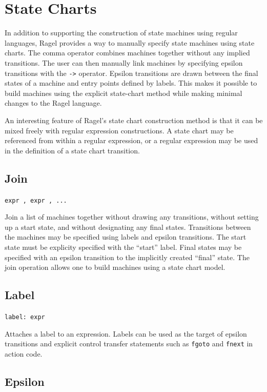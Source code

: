 \documentclass[letterpaper,11pt,oneside]{book}
\newcommand{\verbspace}{\vspace{10pt}}
\begin{document}
\section{State Charts}
\label{state-charts}

In addition to supporting the construction of state machines using regular
languages, Ragel provides a way to manually specify state machines using
state charts.  The comma operator combines machines together without any
implied transitions. The user can then manually link machines by specifying
epsilon transitions with the \verb|->| operator.  Epsilon transitions are drawn
between the final states of a machine and entry points defined by labels.  This
makes it possible to build machines using the explicit state-chart method while
making minimal changes to the Ragel language. 

An interesting feature of Ragel's state chart construction method is that it
can be mixed freely with regular expression constructions. A state chart may be
referenced from within a regular expression, or a regular expression may be
used in the definition of a state chart transition.

\subsection{Join}

\verb|expr , expr , ...|
\verbspace

Join a list of machines together without
drawing any transitions, without setting up a start state, and without
designating any final states. Transitions between the machines may be specified
using labels and epsilon transitions. The start state must be explicity
specified with the ``start'' label. Final states may be specified with an
epsilon transition to the implicitly created ``final'' state. The join
operation allows one to build machines using a state chart model.

\subsection{Label}

\verb|label: expr| 
\verbspace

Attaches a label to an expression. Labels can be
used as the target of epsilon transitions and explicit control transfer
statements such as \verb|fgoto| and \verb|fnext| in action
code.

\subsection{Epsilon}
\end{document}
